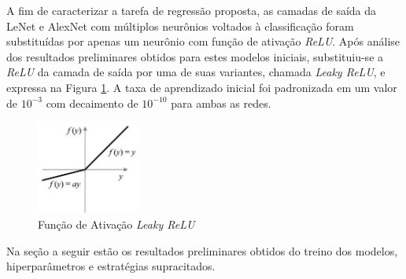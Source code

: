 A fim de caracterizar a tarefa de regressão proposta, as camadas de saída da LeNet e AlexNet com múltiplos neurônios voltados à classificação foram substituídas por apenas um neurônio com função de ativação \emph{ReLU}. Após análise dos resultados preliminares obtidos para estes modelos iniciais, substituiu-se a \emph{ReLU} da camada de saída por uma de suas variantes, chamada \emph{Leaky ReLU}, e expressa na Figura \ref{fig:lrelu}. A taxa de aprendizado inicial foi padronizada em um valor de $10^{-3}$ com decaimento de $10^{-10}$ para ambas as redes.

\begin{figure}[h!]
     \centering
     \includegraphics[width=0.3\textwidth]{img/lrelu}
     \caption{Função de Ativação \emph{Leaky ReLU}}
     \label{fig:lrelu}
\end{figure}

Na seção a seguir estão os resultados preliminares obtidos do treino dos modelos, hiperparâmetros e estratégias supracitados.
